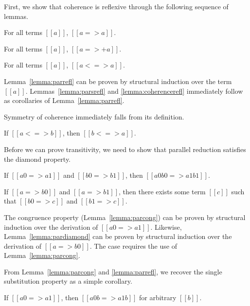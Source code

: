 \documentclass[nonacm]{acmart}
\begin{document}
First, we show that coherence is reflexive through the following
sequence of lemmas.
\begin{lemma}
  \label{lemma:parrefl}
  For all terms $[[a]]$, $[[a => a]]$.
\end{lemma}

\begin{lemma}
  \label{lemma:parsrefl}
  For all terms $[[a]]$, $[[a =>+ a]]$.
\end{lemma}

\begin{lemma}
  \label{lemma:coherencerefl}
  For all terms $[[a]]$, $[[a <=> a]]$.
\end{lemma}

Lemma~\ref{lemma:parrefl} can be proven by structural induction over
the term $[[a]]$. Lemmas~\ref{lemma:parsrefl} and \ref{lemma:coherencerefl}
immediately follow as corollaries of Lemma~\ref{lemma:parrefl}.

Symmetry of coherence immediately falls from its definition.
\begin{lemma}
  \label{lemma:coherencesym}
  If $[[a <=> b]]$, then $[[b <=> a]]$.
\end{lemma}

Before we can prove transitivity, we need to show that parallel
reduction satisfies the diamond property.
\begin{lemma}
  \label{lemma:parcong}
  If $[[a0 => a1]]$ and $[[b0 => b1]]$, then $[[a0 { b0 } => a1 { b1 }]]$.
\end{lemma}
\begin{lemma}
  \label{lemma:pardiamond}
  If $[[a => b0]]$ and $[[a => b1]]$, then there exists some term
  $[[c]]$ such that $[[b0 => c]]$ and $[[b1 => c]]$.
\end{lemma}
The congruence property (Lemma~\ref{lemma:parcong}) can be proven by
structural induction over the derivation of $[[a0 => a1]]$.
Likewise, Lemma~\ref{lemma:pardiamond} can be proven by structural induction
over the derivation of $[[a => b0]]$. The  case requires
the use of Lemma~\ref{lemma:parcong}.

From Lemma~\ref{lemma:parcong} and \ref{lemma:parrefl}, we recover the
single substitution property as a simple corollary.
\begin{corollary}
  \label{lemma:parsubst}
  If $[[a0 => a1]]$, then $[[a0 {b} => a1 {b}]]$ for arbitrary $[[b]]$.
\end{corollary}
\end{document}
